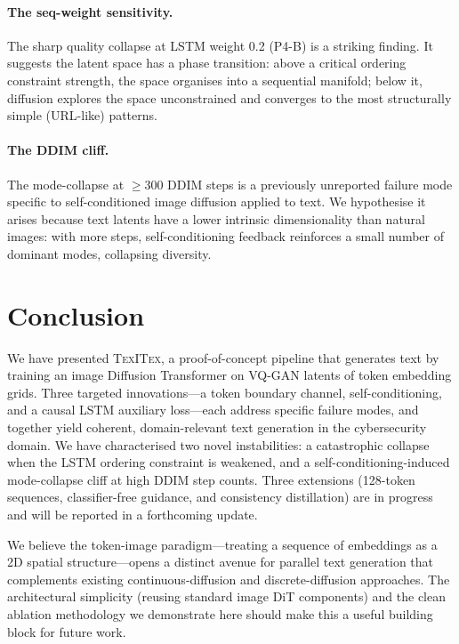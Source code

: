 \documentclass[11pt,a4paper]{article}
\newcommand{\texitex}{\textsc{TexITex}}
\begin{document}
\paragraph{The seq-weight sensitivity.}
The sharp quality collapse at LSTM weight 0.2 (P4-B) is a striking finding.
It suggests the latent space has a phase transition: above a critical ordering constraint
strength, the space organises into a sequential manifold; below it, diffusion explores
the space unconstrained and converges to the most structurally simple (URL-like) patterns.

\paragraph{The DDIM cliff.}
The mode-collapse at $\geq$300 DDIM steps is a previously unreported failure mode
specific to self-conditioned image diffusion applied to text.
We hypothesise it arises because text latents have a lower intrinsic dimensionality
than natural images: with more steps, self-conditioning feedback reinforces a small
number of dominant modes, collapsing diversity.


\section{Conclusion}
\label{sec:conclusion}

We have presented \texitex, a proof-of-concept pipeline that generates text by training
an image Diffusion Transformer on VQ-GAN latents of token embedding grids.
Three targeted innovations---a token boundary channel, self-conditioning, and a causal
LSTM auxiliary loss---each address specific failure modes, and together yield coherent,
domain-relevant text generation in the cybersecurity domain.
We have characterised two novel instabilities: a catastrophic collapse when the LSTM
ordering constraint is weakened, and a self-conditioning-induced mode-collapse cliff
at high DDIM step counts.
Three extensions (128-token sequences, classifier-free guidance, and consistency
distillation) are in progress and will be reported in a forthcoming update.

We believe the token-image paradigm---treating a sequence of embeddings as a 2D spatial
structure---opens a distinct avenue for parallel text generation that complements
existing continuous-diffusion and discrete-diffusion approaches. The architectural
simplicity (reusing standard image DiT components) and the clean ablation methodology
we demonstrate here should make this a useful building block for future work.
\end{document}
